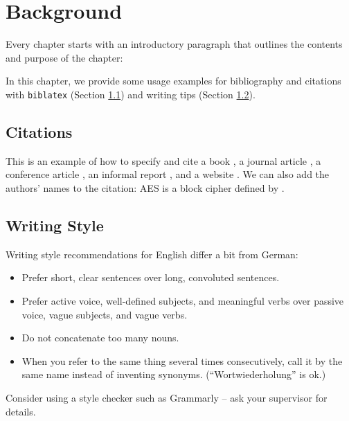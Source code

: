 \documentclass[11pt,titlepage=false]{scrreprt}
\begin{document}

\chapter{Background}
\label{chap:background}

Every chapter starts with an introductory paragraph that outlines the contents and purpose of the chapter:

In this chapter, we provide some usage examples for bibliography and citations with \texttt{biblatex} (Section \ref{sec:bib}) and writing tips (Section \ref{sec:hints}).

\section{Citations}
\label{sec:bib}

This is an example of how to specify and cite
a book \cite{AESbook},
a journal article \cite{bstjShannon49},
a conference article \cite{spKocherHFGGHHLM019},
an informal report \cite{iacrSchneierFKR15},
and a website \cite{webIAIK21}.
We can also add the authors' names to the citation:
AES is a block cipher defined by \textcite{AESbook}.

\section{Writing Style}
\label{sec:hints}

Writing style recommendations for English differ a bit from German:
\begin{itemize}
  \item Prefer short, clear sentences over long, convoluted sentences.
  \item Prefer active voice, well-defined subjects, and meaningful verbs over passive voice, vague subjects, and vague verbs.
  \item Do not concatenate too many nouns.
  \item When you refer to the same thing several times consecutively, call it by the same name instead of inventing synonyms. (``Wortwiederholung'' is ok.)
\end{itemize}
Consider using a style checker such as Grammarly -- ask your supervisor for details.
\end{document}
